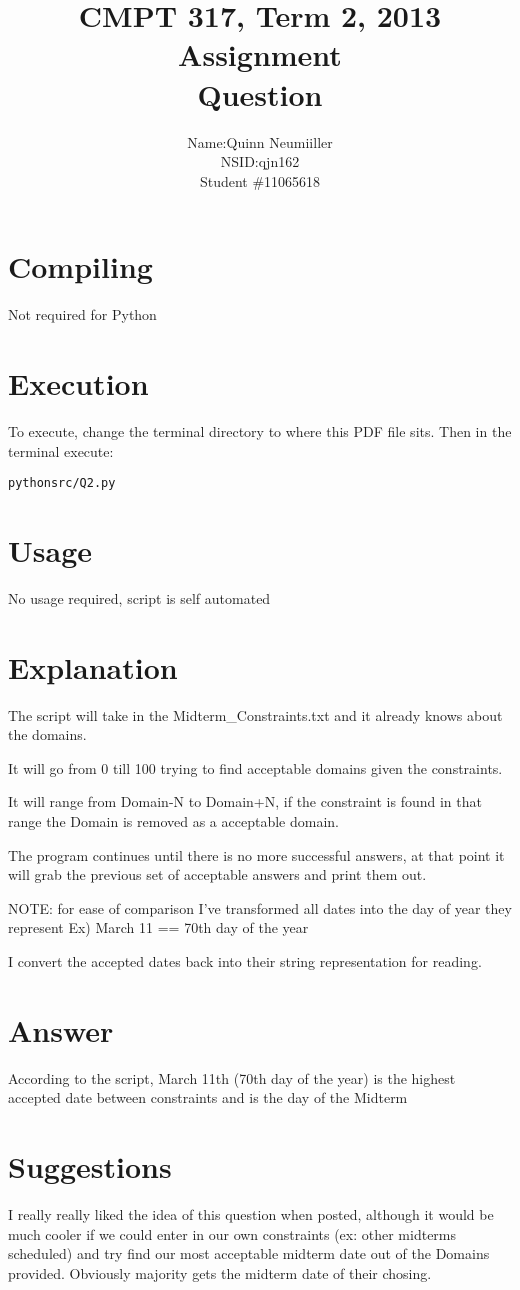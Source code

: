 \documentclass{article}
\title{CMPT 317, Term 2, 2013\\
Assignment \AssignmentNum\\
Question \QuestionNum\\
\AssignmentTitle
}
\author{
	\begin{tabular}{ l r }
	  Name: & Quinn Neumiiller \\
	  NSID: & qjn162 \\
	  Student \# & 11065618 \\
	\end{tabular}
}
\date{\AssignmentDate}
\newcommand{\QuestionNum}{2}
\begin{document}
   \maketitle
   
   \section{Compiling}
   Not required for Python

   \section{Execution}
   To execute, change the terminal directory to where this PDF file sits.
   Then in the terminal execute:
	\begin{alltt}
	python src/Q\QuestionNum.py
	\end{alltt}

  \section{Usage}
    No usage required, script is self automated
  \section{Explanation}
    The script will take in the Midterm\_Constraints.txt and it already knows about the domains.

    It will go from 0 till 100 trying to find acceptable domains given the constraints.

    It will range from Domain-N to Domain+N, if the constraint is found in that range the
    Domain is removed as a acceptable domain.

    The program continues until there is no more successful answers, at that point it will grab the previous
    set of acceptable answers and print them out.

    NOTE: for ease of comparison I've transformed all dates into the day of year they represent
    Ex) March 11 == 70th day of the year

    I convert the accepted dates back into their string representation for reading.
  \section{Answer}
    According to the script, March 11th (70th day of the year) is the highest accepted 
    date between constraints and is the day of the Midterm

  \section{Suggestions}
    I really really liked the idea of this question when posted, although it would be much cooler
    if we could enter in our own constraints (ex: other midterms scheduled) and try find our most
    acceptable midterm date out of the Domains provided. Obviously majority gets the midterm date of their chosing.
\end{document}
